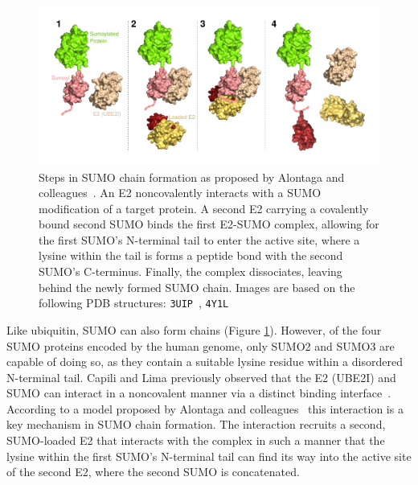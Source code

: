 \begin{figure}[h!]
	\centering
	\includegraphics[width=\textwidth]{img/sumo_chaining.pdf}
	\caption{Steps in SUMO chain formation as proposed by Alontaga and colleagues~\cite{Alontaga2015}. An E2 noncovalently interacts with a SUMO modification of a target protein. A second E2 carrying a covalently bound second SUMO binds the first E2-SUMO complex, allowing for the first SUMO's N-terminal tail to enter the active site, where a lysine within the tail is forms a peptide bond with the second SUMO's C-terminus. Finally, the complex dissociates, leaving behind the newly formed SUMO chain. Images are based on the following PDB structures: \texttt{3UIP}~\cite{Gareau2012}, \texttt{4Y1L}~\cite{Alontaga2015}}
	\label{fig:sumo_chaining}
\end{figure}

Like ubiquitin, SUMO can also form chains (Figure \ref{fig:sumo_chaining}). However, of the four SUMO proteins encoded by the human genome, only SUMO2 and SUMO3 are capable of doing so, as they contain a suitable lysine residue within a disordered N-terminal tail. Capili and Lima previously observed that the E2 (UBE2I) and SUMO can interact in a noncovalent manner via a distinct binding interface~\cite{CapiliLima2007}. According to a model proposed by Alontaga and colleagues~\cite{Alontaga2015} this interaction is a key mechanism in SUMO chain formation. The interaction recruits a second, SUMO-loaded E2 that interacts with the complex in such a manner that the lysine within the first SUMO's N-terminal tail can find its way into the active site of the second E2, where the second SUMO is concatenated.



